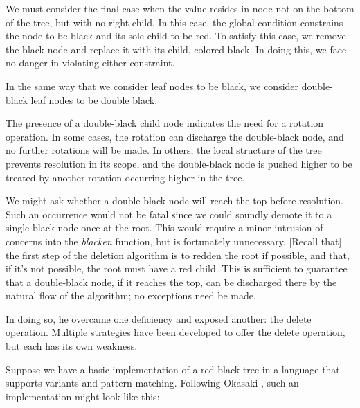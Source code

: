 \documentclass[preprint]{sigplanconf}
\begin{document}
We must consider the final case when the value resides in node not on the bottom of the tree, but with no right child. In this case, the global condition constrains the node to be black and its sole child to be red. To satisfy this case, we remove the black node and replace it with its child, colored black. In doing this, we face no danger in violating either constraint.

In the same way that we consider leaf nodes to be black, we consider double-black leaf nodes to be double black.

The presence of a double-black child node indicates the need for a rotation operation. In some cases, the rotation can discharge the double-black node, and no further rotations will be made. In others, the local structure of the tree prevents resolution in its scope, and the double-black node is pushed higher to be treated by another rotation occurring higher in the tree.

We might ask whether a double black node will reach the top before resolution. Such an occurrence would not be fatal since we could soundly demote it to a single-black node once at the root. This would require a minor intrusion of concerns into the \emph{blacken} function, but is fortunately unnecessary. [Recall that] the first step of the deletion algorithm is to redden the root if possible, and that, if it's not possible, the root must have a red child. This is sufficient to guarantee that a double-black node, if it reaches the top, can be discharged there by the natural flow of the algorithm; no exceptions need be made.

In doing so, he overcame one deficiency and exposed another: the delete operation. Multiple strategies have been developed to offer the delete operation, but each has its own weakness.

Suppose we have a basic implementation of a red-black tree in a language that supports variants and pattern matching. Following Okasaki \cite{okasaki1999functional}, such an implementation might look like this:
\end{document}
